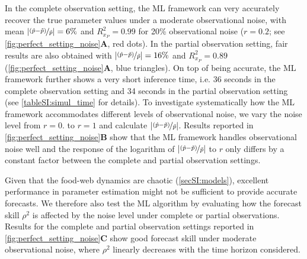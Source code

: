 In the complete observation setting, the ML framework can very accurately recover the true parameter values under a moderate observational noise, with mean $|\nicefrac{(\hat p -\Tilde{p})}{\Tilde{p}}| = 6 \%$ and $R^2_{x_P} = 0.99$ for 20\% observational noise ($r = 0.2$; see \cref{fig:perfect_setting_noise}\textbf{A}, red dots).
%
In the partial observation setting, fair results are also obtained with $|\nicefrac{(\hat p -\Tilde{p})}{\Tilde{p}}| = 16 \%$ and $R^2_{x_P} = 0.89$ (\cref{fig:perfect_setting_noise}\textbf{A}, blue triangles). 
% 
On top of being accurate, the ML framework further shows a very short inference time, i.e. 36 seconds in the complete observation setting and 34 seconds in the partial observation setting (see \cref{tableSI:simul_time} for details).
% 
To investigate systematically how the ML framework accommodates different levels of observational noise, we vary the noise level from $r = 0.$ to $r = 1$ and calculate $|\nicefrac{(\hat p -\Tilde{p})}{\Tilde{p}}|$. Results reported in \cref{fig:perfect_setting_noise}\textbf{B} show that the ML framework handles observational noise well and the response of the logarithm of $|\nicefrac{(\hat p -\Tilde{p})}{\Tilde{p}}|$ to $r$ only differs by a constant factor between the complete and partial observation settings.

Given that the food-web dynamics are chaotic (\cref{secSI:models}), excellent performance in parameter estimation might not be sufficient to provide accurate forecasts. We therefore also test the ML algorithm by evaluating how the forecast skill $\rho^2$ is affected by the noise level under complete or partial observations. Results for the complete and partial observation settings reported in \cref{fig:perfect_setting_noise}\textbf{C} show good forecast skill under moderate observational noise, where $\rho^2$ linearly decreases with the time horizon considered. 

